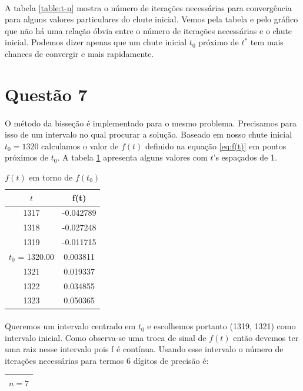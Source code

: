 \documentclass[a4paper,11pt]{article}
\begin{document}
\paragraph{}A tabela \ref{table:t-n} mostra o número de iterações necessárias para convergência para alguns valores particulares do chute inicial. Vemos pela tabela e pelo gráfico que não há uma relação óbvia entre o número de iterações necessárias e o chute inicial. Podemos dizer apenas que um chute inicial $t_0$ próximo de $t^*$ tem mais chances de convergir e mais rapidamente.

\section*{Questão 7}
\paragraph{}O método da bisseção é implementado para o mesmo problema. Precisamos para isso de um intervalo no qual procurar a solução. Baseado em nosso chute inicial $t_0 = 1320$ calculamos o valor de $f(t)$ definido na equação \ref{eq:f(t)} em pontos próximos de $t_0$. A tabela \ref{table:7-1} apresenta alguns valores com $t$'s espaçados de 1.
\begin{table}[!htp]
	\centering
	\begin{tabular}{|c|c|}\hline
		$t$	&	f(t) \\ \hline
		1317 & 	 -0.042789 \\ \hline
		1318 	& -0.027248\\ \hline
		1319 	& -0.011715\\ \hline
		$t_0$ = 1320.00 	& 0.003811\\ \hline
		1321 	& 0.019337\\ \hline
		1322 	& 0.034855\\ \hline
		1323 	& 0.050365\\ \hline
	\end{tabular}
	\caption{$f(t)$ em torno de $f(t_0)$}
	\label{table:7-1}
\end{table} 

\paragraph{}Queremos um intervalo centrado em $t_0$ e escolhemos portanto (1319, 1321) como intervalo inicial. Como observa-se uma troca de sinal de $f(t)$ então devemos ter uma raiz nesse intervalo pois f é contínua. Usando esse intervalo o número de iterações necessárias para termos 6 dígitos de precisão é:
	\begin{table}[!htp]
	\centering
		\begin{tabular}{|c|}\hline
			$n = 7$ \\ \hline
		\end{tabular}
	\end{table}
\end{document}

